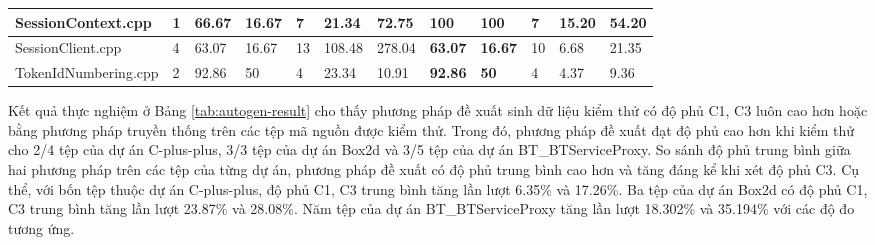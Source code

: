 \begin{table}[h]
{\begin{tabular}{|l|l|lllll|lllll|}
SessionContext.cpp                                   & 1                                                   & \multicolumn{1}{l|}{66.67} & \multicolumn{1}{l|}{16.67} & \multicolumn{1}{l|}{7}   & \multicolumn{1}{l|}{21.34}   & 72.75                     & \multicolumn{1}{l|}{\textbf{100}}   & \multicolumn{1}{l|}{\textbf{100}}   & \multicolumn{1}{l|}{7}   & \multicolumn{1}{l|}{15.20}   & 54.20                     \\ \hline
SessionClient.cpp                                    & 4                                                   & \multicolumn{1}{l|}{63.07} & \multicolumn{1}{l|}{16.67} & \multicolumn{1}{l|}{13}  & \multicolumn{1}{l|}{108.48}  & 278.04                    & \multicolumn{1}{l|}{\textbf{63.07}} & \multicolumn{1}{l|}{\textbf{16.67}} & \multicolumn{1}{l|}{10}  & \multicolumn{1}{l|}{6.68}    & 21.35                     \\ \hline
TokenIdNumbering.cpp                                 & 2                                                   & \multicolumn{1}{l|}{92.86} & \multicolumn{1}{l|}{50}    & \multicolumn{1}{l|}{4}   & \multicolumn{1}{l|}{23.34}   & 10.91                     & \multicolumn{1}{l|}{\textbf{92.86}} & \multicolumn{1}{l|}{\textbf{50}}    & \multicolumn{1}{l|}{4}   & \multicolumn{1}{l|}{4.37}    & 9.36                      \\ \hline
\end{tabular}%
}
\end{table}

Kết quả thực nghiệm ở Bảng \ref{tab:autogen-result} cho thấy phương pháp đề xuất sinh dữ liệu kiểm thử có độ phủ C1, C3 luôn cao hơn hoặc bằng phương pháp truyền thống trên các tệp mã nguồn được kiểm thử. Trong đó, phương pháp đề xuất đạt độ phủ cao hơn khi kiểm thử cho 2/4 tệp của dự án C-plus-plus, 3/3 tệp của dự án Box2d và 3/5 tệp của dự án BT\_BTServiceProxy. So sánh độ phủ trung bình giữa hai phương pháp trên các tệp của từng dự án, phương pháp đề xuất có độ phủ trung bình cao hơn và tăng đáng kể khi xét độ phủ C3. Cụ thể, với bốn tệp thuộc dự án C-plus-plus, độ phủ C1, C3 trung bình tăng lần lượt 6.35\% và 17.26\%. Ba tệp của dự án Box2d có độ phủ C1, C3 trung bình tăng lần lượt 23.87\% và 28.08\%. Năm tệp của dự án BT\_BTServiceProxy tăng lần lượt 18.302\% và 35.194\% với các độ đo tương ứng.


